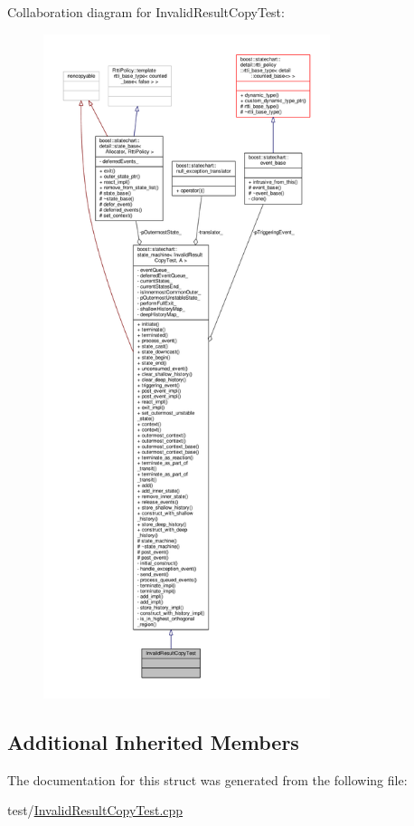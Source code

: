 Collaboration diagram for Invalid\+Result\+Copy\+Test\+:
\nopagebreak
\begin{figure}[H]
\begin{center}
\leavevmode
\includegraphics[height=550pt]{struct_invalid_result_copy_test__coll__graph}
\end{center}
\end{figure}
\subsection*{Additional Inherited Members}


The documentation for this struct was generated from the following file\+:\begin{DoxyCompactItemize}
\item 
test/\mbox{\hyperlink{_invalid_result_copy_test_8cpp}{Invalid\+Result\+Copy\+Test.\+cpp}}\end{DoxyCompactItemize}

